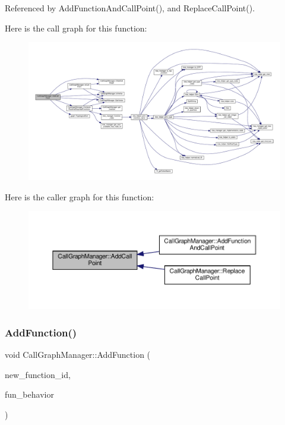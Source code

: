 Referenced by Add\+Function\+And\+Call\+Point(), and Replace\+Call\+Point().

Here is the call graph for this function\+:
\nopagebreak
\begin{figure}[H]
\begin{center}
\leavevmode
\includegraphics[width=350pt]{d5/d96/classCallGraphManager_ab0a2e36673ed04042f4cd69a18e5ca77_cgraph}
\end{center}
\end{figure}
Here is the caller graph for this function\+:
\nopagebreak
\begin{figure}[H]
\begin{center}
\leavevmode
\includegraphics[width=350pt]{d5/d96/classCallGraphManager_ab0a2e36673ed04042f4cd69a18e5ca77_icgraph}
\end{center}
\end{figure}
\mbox{\label{classCallGraphManager_aa0485c1d4e04aebcb51bcc9a594e1822}} 
\subsubsection{\texorpdfstring{Add\+Function()}{AddFunction()}}
{\footnotesize\ttfamily void Call\+Graph\+Manager\+::\+Add\+Function (\begin{DoxyParamCaption}\item[{unsigned int}]{new\+\_\+function\+\_\+id,  }\item[{const \hyperlink{function__behavior_8hpp_affbc6a46ab86ddfabe31c10986d333dc}{Function\+Behavior\+Ref}}]{fun\+\_\+behavior }\end{DoxyParamCaption})}


